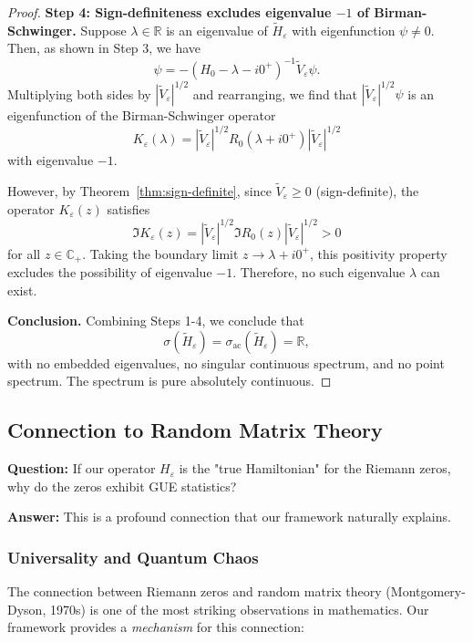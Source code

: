 ﻿\documentclass[12pt,a4paper]{article}
\theoremstyle{definition}
\theoremstyle{remark}
\newcommand{\CC}{\mathbb{C}}
\begin{document}
\begin{proof}
\textbf{Step 4: Sign-definiteness excludes eigenvalue $-1$ of Birman-Schwinger.}
Suppose $\lambda \in \mathbb{R}$ is an eigenvalue of $\widetilde{H}_\varepsilon$ with eigenfunction $\psi \neq 0$. Then, as shown in Step 3, we have
\[
  \psi = -(H_0 - \lambda - i0^+)^{-1} \widetilde{V}_\varepsilon \psi.
\]
Multiplying both sides by $|\widetilde{V}_\varepsilon|^{1/2}$ and rearranging, we find that $|\widetilde{V}_\varepsilon|^{1/2}\psi$ is an eigenfunction of the Birman-Schwinger operator
\[
  K_\varepsilon(\lambda) = |\widetilde{V}_\varepsilon|^{1/2} R_0(\lambda + i0^+) |\widetilde{V}_\varepsilon|^{1/2}
\]
with eigenvalue $-1$.

However, by Theorem~\ref{thm:sign-definite}, since $\widetilde{V}_\varepsilon \geq 0$ (sign-definite), the operator $K_\varepsilon(z)$ satisfies
\[
  \Im K_\varepsilon(z) = |\widetilde{V}_\varepsilon|^{1/2} \Im R_0(z) |\widetilde{V}_\varepsilon|^{1/2} > 0
\]
for all $z \in \CC_+$. Taking the boundary limit $z \to \lambda + i0^+$, this positivity property excludes the possibility of eigenvalue $-1$. Therefore, no such eigenvalue $\lambda$ can exist.

\textbf{Conclusion.}
Combining Steps 1-4, we conclude that
\[
  \sigma(\widetilde{H}_\varepsilon) = \sigma_{\text{ac}}(\widetilde{H}_\varepsilon) = \mathbb{R},
\]
with no embedded eigenvalues, no singular continuous spectrum, and no point spectrum. The spectrum is pure absolutely continuous.
\end{proof}

\subsection{Connection to Random Matrix Theory}

\textbf{Question:} If our operator $H_\varepsilon$ is the "true Hamiltonian" for the Riemann zeros, why do the zeros exhibit GUE statistics?

\textbf{Answer:} This is a profound connection that our framework naturally explains.

\subsubsection{Universality and Quantum Chaos}

The connection between Riemann zeros and random matrix theory (Montgomery-Dyson, 1970s) is one of the most striking observations in mathematics. Our framework provides a \emph{mechanism} for this connection:
\end{document}

